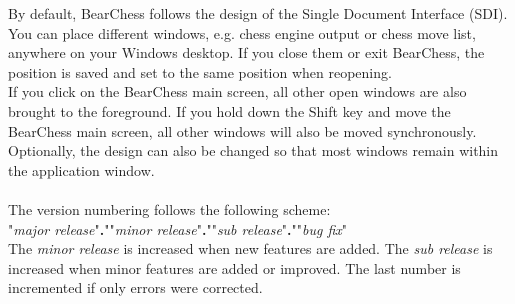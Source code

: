 \documentclass[11pt,a4paper]{article}
\begin{document}
	By default, BearChess follows the design of the Single Document Interface (SDI). You can place different windows, e.g. chess engine output or chess move list, anywhere on your Windows desktop. If you close them or exit BearChess, the position is saved and set to the same position when reopening.\\ 
	If you click on the BearChess main screen, all other open windows are also brought to the foreground. If you hold down the Shift key and move the BearChess main screen, all other windows will also be moved synchronously.\\
	Optionally, the design can also be changed so that most windows remain within the application window.\\\\
	The version numbering follows the following scheme:\\ 
	"\textit{major release}"\textbf{.}""\textit{minor release}"\textbf{.}""\textit{sub release}"\textbf{.}""\textit{bug fix}"\\
	The \textit{minor release} is increased when new features are added. The \textit{sub release} is increased when minor features are added or improved. The last number is incremented if only errors were corrected.
	
	
\end{document}
